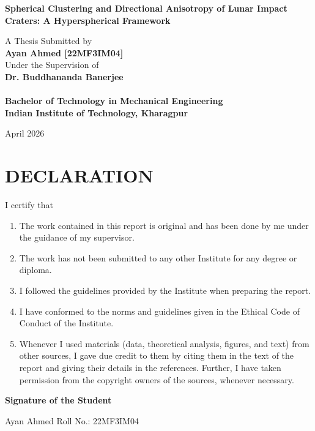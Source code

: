 \documentclass[12pt,a4paper]{report}
\begin{document}
\begin{titlepage}
    \centering
    \vspace*{2cm}
    {\Huge\bfseries Spherical Clustering and Directional Anisotropy of Lunar Impact Craters: A Hyperspherical Framework\\[1cm]}

    \vspace{2cm}
    {\Large A Thesis Submitted by\\[0.3cm]
    \textbf{Ayan Ahmed [22MF3IM04]}\\[0.2cm]
    Under the Supervision of\\[0.5cm]
    \textbf{Dr. Buddhananda Banerjee}\\[0.2cm]
    \\[0.5cm]
    \textbf{Bachelor of Technology in Mechanical Engineering}\\[0.5cm]
    \textbf{Indian Institute of Technology, Kharagpur}}

    \vfill
    \Large {April 2026}
\end{titlepage}

\newpage
\thispagestyle{empty}
\section*{DECLARATION}
\noindent I certify that
\begin{enumerate}
    \item The work contained in this report is original and has been done by me under the guidance of my supervisor.
    \item The work has not been submitted to any other Institute for any degree or diploma.
    \item I followed the guidelines provided by the Institute when preparing the report.
    \item I have conformed to the norms and guidelines given in the Ethical Code of Conduct of the Institute.
    \item Whenever I used materials (data, theoretical analysis, figures, and text) from other sources, I gave due credit to them by citing them in the text of the report and giving their details in the references. Further, I have taken permission from the copyright owners of the sources, whenever necessary.
\end{enumerate}

\vspace{2.5cm}
\noindent \textbf{Signature of the Student}\par
\vspace{1cm}
\noindent Ayan Ahmed \hfill Roll No.: 22MF3IM04
\end{document}
